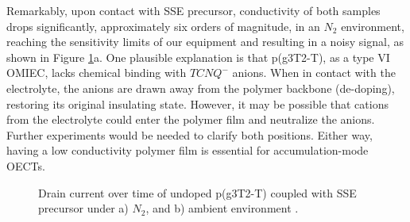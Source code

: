 Remarkably, upon contact with SSE precursor, conductivity of both samples drops significantly, approximately six orders of magnitude, in an $N_{2}$ environment, reaching the sensitivity limits of our equipment and resulting in a noisy signal, as shown in Figure \ref{fig:revox1}a. One plausible explanation is that p(g3T2-T), as a type VI OMIEC, lacks chemical binding with $TCNQ^{-}$ anions. When in contact with the electrolyte, the anions are drawn away from the polymer backbone (de-doping), restoring its original insulating state. However, it may be possible that cations from the electrolyte could enter the polymer film and neutralize the anions. Further experiments would be needed to clarify both positions. Either way, having a low conductivity polymer film is essential for accumulation-mode OECTs.

\begin{figure}[ht]
    \centering
    \caption[Drain current over time of undoped-p(g3T2-T) coupled with SSE precursor]{Drain current over time of undoped p(g3T2-T) coupled with SSE precursor under a) $N_{2}$, and b) ambient environment%
    .}
    \label{fig:revox1}
\end{figure}

